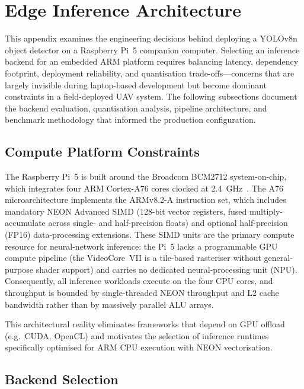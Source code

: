 
\section{Edge Inference Architecture}\label{sec:cv:inference}

This appendix examines the engineering decisions behind deploying a YOLOv8n object detector on a Raspberry Pi~5 companion computer.  Selecting an inference backend for an embedded ARM platform requires balancing latency, dependency footprint, deployment reliability, and quantisation trade-offs---concerns that are largely invisible during laptop-based development but become dominant constraints in a field-deployed UAV system.  The following subsections document the backend evaluation, quantisation analysis, pipeline architecture, and benchmark methodology that informed the production configuration.

\subsection{Compute Platform Constraints}\label{sec:cv:inference:hw}

The Raspberry Pi~5 is built around the Broadcom BCM2712 system-on-chip, which integrates four ARM Cortex-A76 cores clocked at \SI{2.4}{\giga\hertz}~\cite{raspberrypi5}.  The A76 microarchitecture implements the ARMv8.2-A instruction set, which includes mandatory NEON Advanced SIMD (128-bit vector registers, fused multiply-accumulate across single- and half-precision floats) and optional half-precision (FP16) data-processing extensions.  These SIMD units are the primary compute resource for neural-network inference: the Pi~5 lacks a programmable GPU compute pipeline (the VideoCore~VII is a tile-based rasteriser without general-purpose shader support) and carries no dedicated neural-processing unit (NPU).  Consequently, all inference workloads execute on the four CPU cores, and throughput is bounded by single-threaded NEON throughput and L2 cache bandwidth rather than by massively parallel ALU arrays.

This architectural reality eliminates frameworks that depend on GPU offload (e.g.\ CUDA, OpenCL) and motivates the selection of inference runtimes specifically optimised for ARM CPU execution with NEON vectorisation.

\subsection{Backend Selection}\label{sec:cv:inference:backends}

